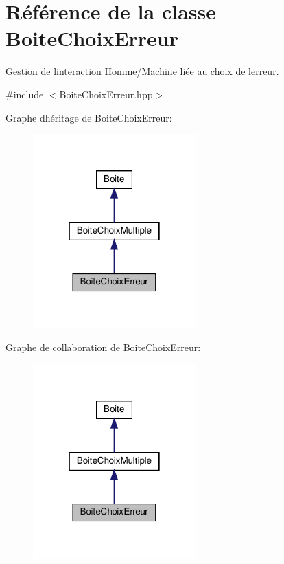 \hypertarget{class_boite_choix_erreur}{}\section{Référence de la classe Boite\+Choix\+Erreur}
\label{class_boite_choix_erreur}


Gestion de l\textquotesingle{}interaction Homme/\+Machine liée au choix de l\textquotesingle{}erreur.  




{\ttfamily \#include $<$Boite\+Choix\+Erreur.\+hpp$>$}



Graphe d\textquotesingle{}héritage de Boite\+Choix\+Erreur\+:\nopagebreak
\begin{figure}[H]
\begin{center}
\leavevmode
\includegraphics[width=178pt]{class_boite_choix_erreur__inherit__graph}
\end{center}
\end{figure}


Graphe de collaboration de Boite\+Choix\+Erreur\+:\nopagebreak
\begin{figure}[H]
\begin{center}
\leavevmode
\includegraphics[width=178pt]{class_boite_choix_erreur__coll__graph}
\end{center}
\end{figure}
